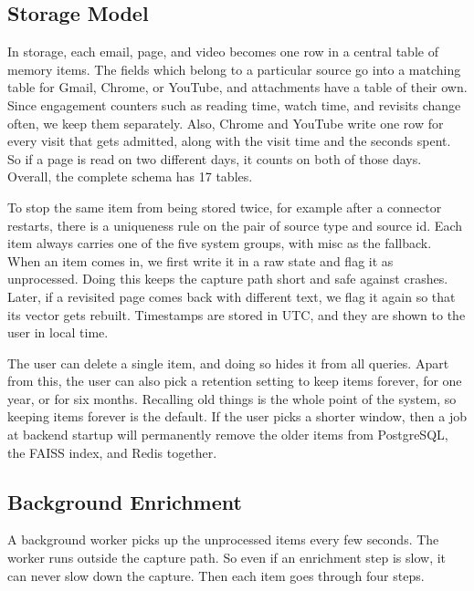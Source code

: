 \documentclass[conference]{IEEEtran}
\begin{document}
\subsection{Storage Model}
In storage, each email, page, and video becomes one row in a central table of memory items. The fields which belong to a particular source go into a matching table for Gmail, Chrome, or YouTube, and attachments have a table of their own. Since engagement counters such as reading time, watch time, and revisits change often, we keep them separately. Also, Chrome and YouTube write one row for every visit that gets admitted, along with the visit time and the seconds spent. So if a page is read on two different days, it counts on both of those days. Overall, the complete schema has 17 tables.

To stop the same item from being stored twice, for example after a connector restarts, there is a uniqueness rule on the pair of source type and source id. Each item always carries one of the five system groups, with misc as the fallback. When an item comes in, we first write it in a raw state and flag it as unprocessed. Doing this keeps the capture path short and safe against crashes. Later, if a revisited page comes back with different text, we flag it again so that its vector gets rebuilt. Timestamps are stored in UTC, and they are shown to the user in local time.

The user can delete a single item, and doing so hides it from all queries. Apart from this, the user can also pick a retention setting to keep items forever, for one year, or for six months. Recalling old things is the whole point of the system, so keeping items forever is the default. If the user picks a shorter window, then a job at backend startup will permanently remove the older items from PostgreSQL, the FAISS index, and Redis together.

\subsection{Background Enrichment}
A background worker picks up the unprocessed items every few seconds. The worker runs outside the capture path. So even if an enrichment step is slow, it can never slow down the capture. Then each item goes through four steps.
\end{document}
